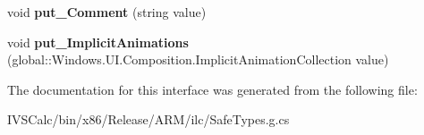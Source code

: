 \begin{DoxyCompactItemize}
\mbox{\label{interface_windows_1_1_u_i_1_1_composition_1_1_i_composition_object2_a724426452fb19b2b146681bf0b264ac1}} 
void {\bfseries put\+\_\+\+Comment} (string value)
\item 
\mbox{\label{interface_windows_1_1_u_i_1_1_composition_1_1_i_composition_object2_a968d62a160aef72621974d9f819c661b}} 
void {\bfseries put\+\_\+\+Implicit\+Animations} (global\+::\+Windows.\+U\+I.\+Composition.\+Implicit\+Animation\+Collection value)
\end{DoxyCompactItemize}


The documentation for this interface was generated from the following file\+:\begin{DoxyCompactItemize}
\item 
I\+V\+S\+Calc/bin/x86/\+Release/\+A\+R\+M/ilc/Safe\+Types.\+g.\+cs\end{DoxyCompactItemize}
